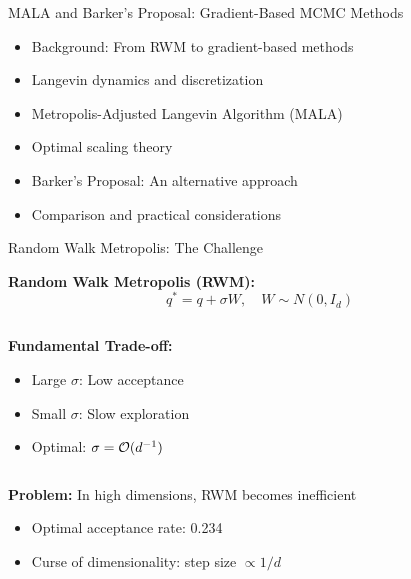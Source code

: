 \documentclass[aspectratio=169]{beamer}
\begin{document}
\begin{frame}{MALA and Barker's Proposal: Gradient-Based MCMC Methods}
\Large
\begin{itemize}
    \item Background: From RWM to gradient-based methods
    \item Langevin dynamics and discretization
    \item Metropolis-Adjusted Langevin Algorithm (MALA)
    \item Optimal scaling theory
    \item Barker's Proposal: An alternative approach
    \item Comparison and practical considerations
\end{itemize}
\end{frame}

\begin{frame}{Random Walk Metropolis: The Challenge}

\textbf{Random Walk Metropolis (RWM):}
$$q^* = q + \sigma W, \quad W \sim N(0, I_d)$$

\begin{columns}
\begin{column}{0.46\textwidth}
\textbf{Fundamental Trade-off:}
\begin{itemize}
    \item Large $\sigma$: Low acceptance
    \item Small $\sigma$: Slow exploration
    \item Optimal: $\sigma = \mathcal{O}(d^{-1})$
\end{itemize}
\end{column}
\begin{column}{0.46\textwidth}
\end{column}
\end{columns}

\vspace{1em}
\textbf{Problem:} In high dimensions, RWM becomes inefficient
\begin{itemize}
    \item Optimal acceptance rate: 0.234
    \item Curse of dimensionality: step size $\propto 1/d$
\end{itemize}
\end{frame}
\end{document}
